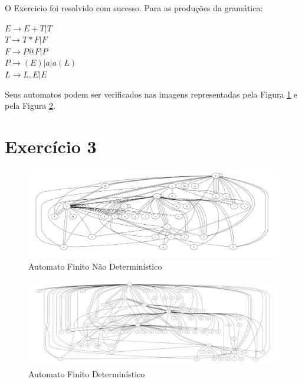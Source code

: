 \documentclass[a4paper, 10pt]{article}
\begin{document}
O Exercicio foi resolvido com sucesso. Para as produções da gramática:
\begin{center}
    $E  \to  E + T | T$ \\
    $T  \to  T * F | F$ \\
    $F  \to  P @ F | P$ \\
    $P  \to  ( E ) | a | a ( L )$ \\
    $L  \to  L , E | E$ \\
\end{center}
Seus automatos podem ser verificados nas imagens representadas pela Figura \ref{fig:naodeterministico} e pela Figura \ref{fig:deterministico}.

\section*{Exercício 3}

\begin{figure}
  \begin{center}
  \includegraphics[width=\linewidth]{./../nao_deterministico.png}
  \caption{Automato Finito Não Determinístico}
  \label{fig:naodeterministico}
  \end{center}
\end{figure}

\begin{figure}
  \begin{center}
  \includegraphics[width=\linewidth]{./../deterministico.png}
  \caption{Automato Finito Determinístico}
  \label{fig:deterministico}
  \end{center}
\end{figure}

% 

\end{document}
